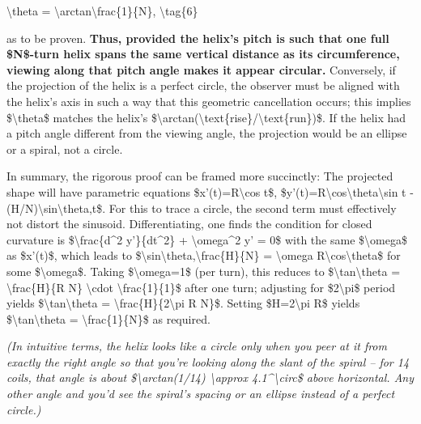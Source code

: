 \documentclass[]{article}
\begin{document}
\textbackslash{}theta =
\textbackslash{}arctan\textbackslash{}frac\{1\}\{N\},
\textbackslash{}tag\{6\}

as to be proven. \textbf{Thus, provided the helix's pitch is such that
one full \$N\$-turn helix spans the same vertical distance as its
circumference, viewing along that pitch angle makes it appear circular.}
Conversely, if the projection of the helix is a perfect circle, the
observer must be aligned with the helix's axis in such a way that this
geometric cancellation occurs; this implies \$\textbackslash{}theta\$
matches the helix's
\$\textbackslash{}arctan(\textbackslash{}text\{rise\}/\textbackslash{}text\{run\})\$.
If the helix had a pitch angle different from the viewing angle, the
projection would be an ellipse or a spiral, not a circle.

In summary, the rigorous proof can be framed more succinctly: The
projected shape will have parametric equations
\$x'(t)=R\textbackslash{}cos t\$,
\$y'(t)=R\textbackslash{}cos\textbackslash{}theta\textbackslash{}sin t -
(H/N)\textbackslash{}sin\textbackslash{}theta,t\$. For this to trace a
circle, the second term must effectively not distort the sinusoid.
Differentiating, one finds the condition for closed curvature is
\$\textbackslash{}frac\{d\^{}2 y'\}\{dt\^{}2\} +
\textbackslash{}omega\^{}2 y' = 0\$ with the same
\$\textbackslash{}omega\$ as \$x'(t)\$, which leads to
\$\textbackslash{}sin\textbackslash{}theta,\textbackslash{}frac\{H\}\{N\}
= \textbackslash{}omega R\textbackslash{}cos\textbackslash{}theta\$ for
some \$\textbackslash{}omega\$. Taking \$\textbackslash{}omega=1\$ (per
turn), this reduces to \$\textbackslash{}tan\textbackslash{}theta =
\textbackslash{}frac\{H\}\{R N\} \textbackslash{}cdot
\textbackslash{}frac\{1\}\{1\}\$ after one turn; adjusting for
\$2\textbackslash{}pi\$ period yields
\$\textbackslash{}tan\textbackslash{}theta =
\textbackslash{}frac\{H\}\{2\textbackslash{}pi R N\}\$. Setting
\$H=2\textbackslash{}pi R\$ yields
\$\textbackslash{}tan\textbackslash{}theta =
\textbackslash{}frac\{1\}\{N\}\$ as required.

\emph{(In intuitive terms, the helix looks like a circle only when you
peer at it from exactly the right angle so that you're looking along the
slant of the spiral -- for 14 coils, that angle is about
\$\textbackslash{}arctan(1/14) \textbackslash{}approx
4.1\^{}\textbackslash{}circ\$ above horizontal. Any other angle and
you'd see the spiral's spacing or an ellipse instead of a perfect
circle.)}
\end{document}
